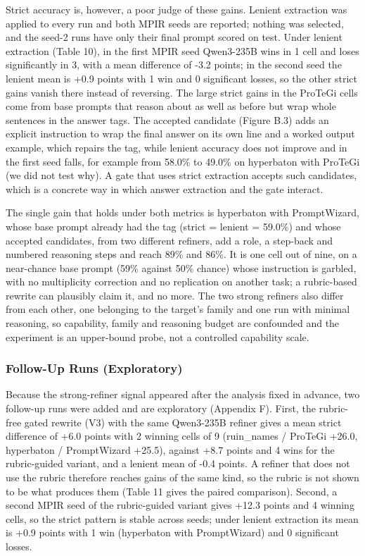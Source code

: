 \documentclass{ieeeaccess}
\begin{document}
Strict accuracy is, however, a poor judge of these gains. Lenient extraction was applied to every run and both MPIR seeds are reported; nothing was selected, and the seed-2 runs have only their final prompt scored on test. Under lenient extraction (Table 10), in the first MPIR seed Qwen3-235B wins in 1 cell and loses significantly in 3, with a mean difference of -3.2 points; in the second seed the lenient mean is +0.9 points with 1 win and 0 significant losses, so the other strict gains vanish there instead of reversing. The large strict gains in the ProTeGi cells come from base prompts that reason about as well as before but wrap whole sentences in the answer tags. The accepted candidate (Figure B.3) adds an explicit instruction to wrap the final answer on its own line and a worked output example, which repairs the tag, while lenient accuracy does not improve and in the first seed falls, for example from 58.0\% to 49.0\% on hyperbaton with ProTeGi (we did not test why). A gate that uses strict extraction accepts such candidates, which is a concrete way in which answer extraction and the gate interact.

The single gain that holds under both metrics is hyperbaton with PromptWizard, whose base prompt already had the tag (strict = lenient = 59.0\%) and whose accepted candidates, from two different refiners, add a role, a step-back and numbered reasoning steps and reach 89\% and 86\%. It is one cell out of nine, on a near-chance base prompt (59\% against 50\% chance) whose instruction is garbled, with no multiplicity correction and no replication on another task; a rubric-based rewrite can plausibly claim it, and no more. The two strong refiners also differ from each other, one belonging to the target's family and one run with minimal reasoning, so capability, family and reasoning budget are confounded and the experiment is an upper-bound probe, not a controlled capability scale.

\subsubsection{Follow-Up Runs (Exploratory)}

Because the strong-refiner signal appeared after the analysis fixed in advance, two follow-up runs were added and are exploratory (Appendix F). First, the rubric-free gated rewrite (V3) with the same Qwen3-235B refiner gives a mean strict difference of +6.0 points with 2 winning cells of 9 (ruin\_\allowbreak{}names / ProTeGi +26.0, hyperbaton / PromptWizard +25.5), against +8.7 points and 4 wins for the rubric-guided variant, and a lenient mean of -0.4 points. A refiner that does not use the rubric therefore reaches gains of the same kind, so the rubric is not shown to be what produces them (Table 11 gives the paired comparison). Second, a second MPIR seed of the rubric-guided variant gives +12.3 points and 4 winning cells, so the strict pattern is stable across seeds; under lenient extraction its mean is +0.9 points with 1 win (hyperbaton with PromptWizard) and 0 significant losses.
\end{document}

